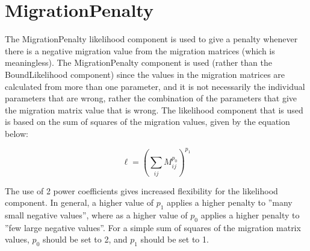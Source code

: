 \documentclass[10pt,twoside]{book}
\begin{document}




\section{MigrationPenalty}\label{sec:migpenalty}
The MigrationPenalty likelihood component is used to give a penalty whenever there is a negative migration value from the migration matrices (which is meaningless).  The MigrationPenalty component is used (rather than the BoundLikelihood component) since the values in the migration matrices are calculated from more than one parameter, and it is not necessarily the individual parameters that are wrong, rather the combination of the parameters that give the migration matrix value that is wrong.  The likelihood component that is used is based on the sum of squares of the migration values, given by the equation below:

\begin{equation}\label{eq:migpenalty}
\ell = \left( \sum_{ij}^{} M_{ij}^{p_0} \right)^{p_1}
\end{equation}

\bigskip
The use of 2 power coefficients gives increased flexibility for the likelihood component.  In general, a higher value of $p_1$ applies a higher penalty to ''many small negative values'', where as a higher value of $p_0$ applies a higher penalty to ''few large negative values''.  For a simple sum of squares of the migration matrix values, $p_0$ should be set to 2, and $p_1$ should be set to 1.
\end{document}
